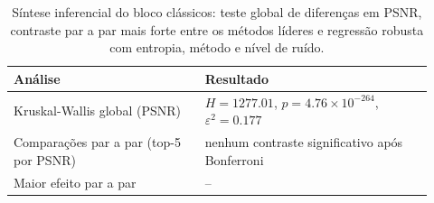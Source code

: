 \begin{table}[htbp]
\centering
\caption{Síntese inferencial do bloco clássicos: teste global de diferenças em PSNR, contraste par a par mais forte entre os métodos líderes e regressão robusta com entropia, método e nível de ruído.}
\label{tab:inferential-summary-classical}
\footnotesize
\begin{tabular}{p{0.42\linewidth}p{0.50\linewidth}}
\toprule
Análise & Resultado \\
\midrule
Kruskal-Wallis global (PSNR) & $H=1277.01$, $p=4.76\times 10^{-264}$, $\varepsilon^2=0.177$ \\
Comparações par a par (top-5 por PSNR) & nenhum contraste significativo após Bonferroni \\
Maior efeito par a par & -- \\
\bottomrule
\end{tabular}
\end{table}
